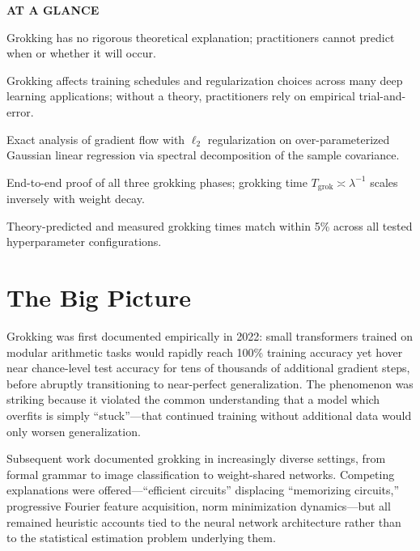 \documentclass[10pt,twocolumn]{article}
\begin{document}
\begin{mdframed}[backgroundcolor=boxgray,linecolor=rulered,linewidth=1pt,
    innerleftmargin=6pt,innerrightmargin=6pt,
    innertopmargin=6pt,innerbottommargin=6pt]
\textbf{\small AT A GLANCE}\par\vspace{4pt}
\begin{description}[leftmargin=0pt,labelsep=4pt,itemsep=2pt,parsep=0pt,
    font=\small\bfseries]
  \item[Problem:] Grokking has no rigorous theoretical explanation;
    practitioners cannot predict when or whether it will occur.
  \item[Why it matters:] Grokking affects training schedules and
    regularization choices across many deep learning applications; without
    a theory, practitioners rely on empirical trial-and-error.
  \item[Method:] Exact analysis of gradient flow with $\ell_2$ regularization
    on over-parameterized Gaussian linear regression via spectral decomposition
    of the sample covariance.
  \item[Result:] End-to-end proof of all three grokking phases; grokking time
    $T_{\text{grok}} \asymp \lambda^{-1}$ scales inversely with weight decay.
  \item[Evidence:] Theory-predicted and measured grokking times match within
    5\% across all tested hyperparameter configurations.
\end{description}
\end{mdframed}

\section{The Big Picture}

Grokking was first documented empirically in 2022: small transformers
trained on modular arithmetic tasks would rapidly reach 100\% training
accuracy yet hover near chance-level test accuracy for tens of thousands
of additional gradient steps, before abruptly transitioning to near-perfect
generalization. The phenomenon was striking because it violated the common
understanding that a model which overfits is simply ``stuck''---that
continued training without additional data would only worsen generalization.

Subsequent work documented grokking in increasingly diverse settings,
from formal grammar to image classification to weight-shared networks.
Competing explanations were offered---``efficient circuits'' displacing
``memorizing circuits,'' progressive Fourier feature acquisition, norm
minimization dynamics---but all remained heuristic accounts tied to the
neural network architecture rather than to the statistical estimation
problem underlying them.
\end{document}
